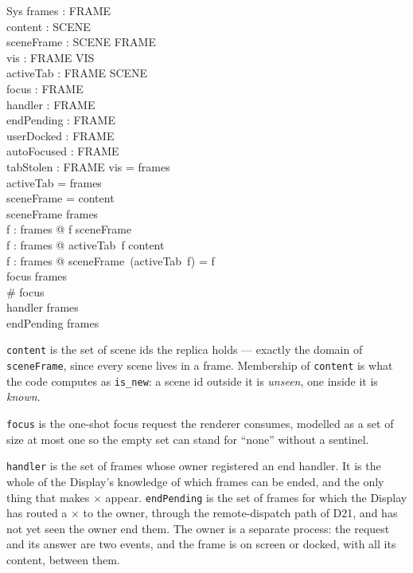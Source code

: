 \documentclass[a4paper,10pt,fleqn]{article}
\begin{document}
\begin{schema}{Sys}
  frames : \power FRAME \\
  content : \power SCENE \\
  sceneFrame : SCENE \pfun FRAME \\
  vis : FRAME \pfun VIS \\
  activeTab : FRAME \pfun SCENE \\
  focus : \power FRAME \\
  handler : \power FRAME \\
  endPending : \power FRAME \\
  userDocked : \power FRAME \\
  autoFocused : \power FRAME \\
  tabStolen : \power FRAME
\where
  \dom vis = frames \\
  \dom activeTab = frames \\
  \dom sceneFrame = content \\
  \ran sceneFrame \subseteq frames \\
  \forall f : frames @ f \in \ran sceneFrame \\
  \forall f : frames @ activeTab~f \in content \\
  \forall f : frames @ sceneFrame~(activeTab~f) = f \\
  focus \subseteq frames \\
  \# focus  \\
  handler \subseteq frames \\
  endPending \subseteq frames
\end{schema}

\texttt{content} is the set of scene ids the replica holds --- exactly the
domain of \texttt{sceneFrame}, since every scene lives in a frame.  Membership
of \texttt{content} is what the code computes as \texttt{is\_new}: a scene id
outside it is \emph{unseen}, one inside it is \emph{known}.

\texttt{focus} is the one-shot focus request the renderer consumes, modelled
as a set of size at most one so the empty set can stand for ``none'' without
a sentinel.

\texttt{handler} is the set of frames whose owner registered an end handler.
It is the whole of the Display's knowledge of which frames can be ended, and
the only thing that makes \textbf{$\times$} appear.  \texttt{endPending} is
the set of frames for which the Display has routed a \textbf{$\times$} to the
owner, through the remote-dispatch path of D21, and has not yet seen the
owner end them.  The owner is a separate process: the request and its answer
are two events, and the frame is on screen or docked, with all its content,
between them.
\end{document}
